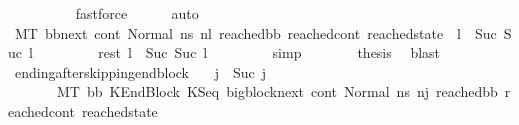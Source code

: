 \begin{isabellebody}
\ \ \ \ \ \ \ \ \isamarkupfalse%
\ fastforce\isanewline
\ \ \ \ \isamarkupfalse%
\ auto\isanewline
\ \ \ \ \isamarkupfalse%
\ {\isachardoublequoteopen}{\isacharparenleft}{\kern0pt}M{\isacharcomma}{\kern0pt}{\isasymLambda}{\isacharcomma}{\kern0pt}{\isasymGamma}{\isacharcomma}{\kern0pt}{\isasymOmega}{\isacharcomma}{\kern0pt}T\ {\isasymturnstile}{\isacharparenleft}{\kern0pt}bb{\isacharunderscore}{\kern0pt}next{\isacharcomma}{\kern0pt}\ cont{}{\isacharcomma}{\kern0pt}\ Normal\ ns{}{\isacharparenright}{\kern0pt}\ {\isacharminus}{\kern0pt}n{\isasymlongrightarrow}{\isacharcircum}{\kern0pt}l{}\ {\isacharparenleft}{\kern0pt}reached{\isacharunderscore}{\kern0pt}bb{\isacharcomma}{\kern0pt}\ reached{\isacharunderscore}{\kern0pt}cont{\isacharcomma}{\kern0pt}\ reached{\isacharunderscore}{\kern0pt}state{\isacharparenright}{\kern0pt}{\isacharparenright}{\kern0pt}\ {\isasymand}\ {\isacharparenleft}{\kern0pt}l\ {\isacharequal}{\kern0pt}\ Suc\ {\isacharparenleft}{\kern0pt}Suc\ l{}{\isacharparenright}{\kern0pt}{\isacharparenright}{\kern0pt}{\isachardoublequoteclose}\ \isanewline
\ \ \ \ \ \ \isamarkupfalse%
\ rest\ {\isacartoucheopen}l\ {\isacharequal}{\kern0pt}\ Suc\ {\isacharparenleft}{\kern0pt}Suc\ l{}{\isacharparenright}{\kern0pt}{\isacartoucheclose}\ \isanewline
\ \ \ \ \ \ \isamarkupfalse%
\ simp\isanewline
\ \ \ \ \isamarkupfalse%
\ \isamarkupfalse%
\ {\isacharquery}{\kern0pt}thesis\ \isamarkupfalse%
\ blast\isanewline
\ \ \isamarkupfalse%
\isanewline
{}\isamarkupfalse%
%
\endisatagproof
{\isafoldproof}%
%
\isadelimproof
\isanewline
%
\endisadelimproof
\isanewline
{}\isamarkupfalse%
\ ending{\isacharunderscore}{\kern0pt}after{\isacharunderscore}{\kern0pt}skipping{\isacharunderscore}{\kern0pt}endblock{}{\isacharcolon}{\kern0pt}\isanewline
\ \ \ {\isachardoublequoteopen}j\ {\isacharequal}{\kern0pt}\ Suc\ j{\isacharprime}{\kern0pt}{\isachardoublequoteclose}\ \isanewline
\ \ \ \ \ \ \ {\isachardoublequoteopen}M{\isacharcomma}{\kern0pt}{\isasymLambda}{\isacharcomma}{\kern0pt}{\isasymGamma}{\isacharcomma}{\kern0pt}{\isasymOmega}{\isacharcomma}{\kern0pt}T\ {\isasymturnstile}{\isacharparenleft}{\kern0pt}bb{\isacharcomma}{\kern0pt}\ KEndBlock\ {\isacharparenleft}{\kern0pt}KSeq\ bigblock{\isacharunderscore}{\kern0pt}next\ cont{}{\isacharparenright}{\kern0pt}{\isacharcomma}{\kern0pt}\ Normal\ ns{}{\isacharprime}{\kern0pt}{\isacharprime}{\kern0pt}{\isacharparenright}{\kern0pt}\ {\isacharminus}{\kern0pt}n{\isasymlongrightarrow}{\isacharcircum}{\kern0pt}j{\isacharprime}{\kern0pt}\ {\isacharparenleft}{\kern0pt}reached{\isacharunderscore}{\kern0pt}bb{\isacharcomma}{\kern0pt}\ reached{\isacharunderscore}{\kern0pt}cont{\isacharcomma}{\kern0pt}\ reached{\isacharunderscore}{\kern0pt}state{\isacharparenright}{\kern0pt}{\isachardoublequoteclose}\ \isanewline

\end{isabellebody}
